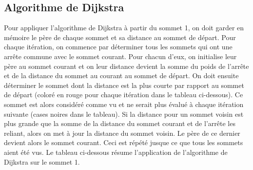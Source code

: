 \documentclass{article}
\begin{document}
\subsection{Algorithme de Dijkstra}
\bigskip
Pour appliquer l'algorithme de Dijkstra à partir du sommet 1, on doit garder en mémoire le père de chaque sommet et sa distance au sommet de départ.
\newline
Pour chaque itération, on commence par déterminer tous les sommets qui ont une arrête commune avec le sommet courant. Pour chacun d'eux, on initialise leur père au sommet courant et on leur distance devient la somme du poids de l'arrête et de la distance du sommet au courant au sommet de départ.
\newline 
On doit ensuite déterminer le sommet dont la distance est la plus courte par rapport au sommet de départ (coloré en rouge pour chaque itération dans le tableau ci-dessous). Ce sommet est alors considéré comme vu et ne serait plus évalué à chaque itération suivante (cases noires dans le tableau).
\newline
Si la distance pour un sommet voisin est plus grande que la somme de la distance du sommet courant et de l'arrête les reliant, alors on met à jour la distance du sommet voisin. Le père de ce dernier devient alors le sommet courant.
\newline
Ceci est répété jusque ce que tous les sommets aient été vus. Le tableau ci-dessous résume l'application de l'algorithme de Dijkstra sur le sommet 1.
\bigskip
\newline
\end{document}
